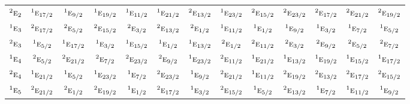\documentclass[10pt,a4paper]{article}
\numberwithin{equation}{section}
\newcommand{\irr}[1]{\text{\normalfont\scshape #1}}
\newcommand{\conjpair}[1]{{}^{#1}}
\begin{document}
{\begin{longtable}{@{}lcccccccccccc@{}}
$\conjpair{2}\irr{e}_{2}$ & $\conjpair{1}\irr{e}_{17/2}$ & $\conjpair{1}\irr{e}_{9/2}$ & $\conjpair{1}\irr{e}_{19/2}$ & $\conjpair{1}\irr{e}_{11/2}$ & $\conjpair{1}\irr{e}_{21/2}$ & $\conjpair{2}\irr{e}_{13/2}$ & $\conjpair{1}\irr{e}_{23/2}$ & $\conjpair{2}\irr{e}_{15/2}$ & $\conjpair{2}\irr{e}_{23/2}$ & $\conjpair{2}\irr{e}_{17/2}$ & $\conjpair{2}\irr{e}_{21/2}$ & $\conjpair{2}\irr{e}_{19/2}$\\
$\conjpair{1}\irr{e}_{3}$ & $\conjpair{2}\irr{e}_{17/2}$ & $\conjpair{2}\irr{e}_{5/2}$ & $\conjpair{2}\irr{e}_{15/2}$ & $\conjpair{2}\irr{e}_{3/2}$ & $\conjpair{2}\irr{e}_{13/2}$ & $\conjpair{2}\irr{e}_{1/2}$ & $\conjpair{1}\irr{e}_{11/2}$ & $\conjpair{1}\irr{e}_{1/2}$ & $\conjpair{1}\irr{e}_{9/2}$ & $\conjpair{1}\irr{e}_{3/2}$ & $\conjpair{1}\irr{e}_{7/2}$ & $\conjpair{1}\irr{e}_{5/2}$\\
$\conjpair{2}\irr{e}_{3}$ & $\conjpair{1}\irr{e}_{5/2}$ & $\conjpair{1}\irr{e}_{17/2}$ & $\conjpair{1}\irr{e}_{3/2}$ & $\conjpair{1}\irr{e}_{15/2}$ & $\conjpair{1}\irr{e}_{1/2}$ & $\conjpair{1}\irr{e}_{13/2}$ & $\conjpair{2}\irr{e}_{1/2}$ & $\conjpair{2}\irr{e}_{11/2}$ & $\conjpair{2}\irr{e}_{3/2}$ & $\conjpair{2}\irr{e}_{9/2}$ & $\conjpair{2}\irr{e}_{5/2}$ & $\conjpair{2}\irr{e}_{7/2}$\\
$\conjpair{1}\irr{e}_{4}$ & $\conjpair{2}\irr{e}_{5/2}$ & $\conjpair{2}\irr{e}_{21/2}$ & $\conjpair{2}\irr{e}_{7/2}$ & $\conjpair{2}\irr{e}_{23/2}$ & $\conjpair{2}\irr{e}_{9/2}$ & $\conjpair{1}\irr{e}_{23/2}$ & $\conjpair{2}\irr{e}_{11/2}$ & $\conjpair{1}\irr{e}_{21/2}$ & $\conjpair{1}\irr{e}_{13/2}$ & $\conjpair{1}\irr{e}_{19/2}$ & $\conjpair{1}\irr{e}_{15/2}$ & $\conjpair{1}\irr{e}_{17/2}$\\
$\conjpair{2}\irr{e}_{4}$ & $\conjpair{1}\irr{e}_{21/2}$ & $\conjpair{1}\irr{e}_{5/2}$ & $\conjpair{1}\irr{e}_{23/2}$ & $\conjpair{1}\irr{e}_{7/2}$ & $\conjpair{2}\irr{e}_{23/2}$ & $\conjpair{1}\irr{e}_{9/2}$ & $\conjpair{2}\irr{e}_{21/2}$ & $\conjpair{1}\irr{e}_{11/2}$ & $\conjpair{2}\irr{e}_{19/2}$ & $\conjpair{2}\irr{e}_{13/2}$ & $\conjpair{2}\irr{e}_{17/2}$ & $\conjpair{2}\irr{e}_{15/2}$\\
$\conjpair{1}\irr{e}_{5}$ & $\conjpair{2}\irr{e}_{21/2}$ & $\conjpair{2}\irr{e}_{1/2}$ & $\conjpair{2}\irr{e}_{19/2}$ & $\conjpair{1}\irr{e}_{1/2}$ & $\conjpair{2}\irr{e}_{17/2}$ & $\conjpair{1}\irr{e}_{3/2}$ & $\conjpair{2}\irr{e}_{15/2}$ & $\conjpair{1}\irr{e}_{5/2}$ & $\conjpair{2}\irr{e}_{13/2}$ & $\conjpair{1}\irr{e}_{7/2}$ & $\conjpair{1}\irr{e}_{11/2}$ & $\conjpair{1}\irr{e}_{9/2}$\\

\end{longtable}}
\end{document}
